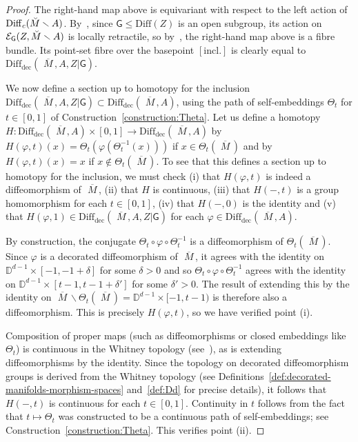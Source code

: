 \documentclass[AHL,Unicode,published]{cedram}
\newcommand{\Diff}{\mathrm{Diff}}
\newcommand{\rincl}{\mathrm{incl}}
\newcommand{\rdec}{\mathrm{dec}}
\newcommand{\mbar}{\ensuremath{{\,\,\overline{\!\! M\!}\,}}}
\newcommand{\sG}{\mathsf{G}}
\newcommand{\cE}{\mathcal{E}}
\newcommand{\bD}{\mathbb{D}}
\newcommand{\diffdec}{\ensuremath{\mathrm{Diff}_{\rdec}}}
\renewcommand{\leq}{\leqslant}
\begin{document}
\begin{proof}
The right-hand map above is equivariant with respect to the left action of $\Diff_c(\Breve{M} \smallsetminus A)$. By~\cite[Prop.~4.15]{Palmer2018HomologicalstabilitymoduliI}, since $\sG \leq \Diff(Z)$ is an open subgroup, its action on $\cE_{\sG}(Z,\Breve{M} \smallsetminus A)$ is locally retractile, so by~\cite[Th.~A]{Palais1960Localtrivialityof}, the right-hand map above is a fibre bundle. Its point-set fibre over the basepoint $[\rincl.]$ is clearly equal to $\diffdec(\mbar,A,Z|\sG)$.

We now define a section up to homotopy for the inclusion $\diffdec(\mbar,A,Z|\sG) \subset \diffdec(\mbar,A)$, using the path of self-embeddings $\Theta_t$ for $t \in [0,1]$ of Construction~\ref{construction:Theta}. Let us define a homotopy $H \colon \diffdec(\mbar,A) \times [0,1] \to \diffdec(\mbar,A)$ by $H(\varphi,t)(x) = \Theta_t(\varphi(\Theta_t^{-1}(x)))$ if $x \in \Theta_t(\mbar)$ and by $H(\varphi,t)(x) = x$ if $x \notin \Theta_t(\mbar)$. To see that this defines a section up to homotopy for the inclusion, we must check (i) that $H(\varphi,t)$ is indeed a diffeomorphism of $\mbar$, (ii) that $H$ is continuous, (iii) that $H(-,t)$ is a group homomorphism for each $t \in [0,1]$, (iv) that $H(-,0)$ is the identity and (v) that $H(\varphi,1) \in \diffdec(\mbar,A,Z|\sG)$ for each $\varphi \in \diffdec(\mbar,A)$.

By construction, the conjugate $\Theta_t \circ \varphi \circ \Theta_t^{-1}$ is a diffeomorphism of $\Theta_t(\mbar)$. Since $\varphi$ is a decorated diffeomorphism of $\mbar$, it agrees with the identity on $\bD^{d-1} \times [-1,-1+\delta]$ for some $\delta > 0$ and so $\Theta_t \circ \varphi \circ \Theta_t^{-1}$ agrees with the identity on $\bD^{d-1} \times [t-1,t-1+\delta']$ for some $\delta' > 0$. The result of extending this by the identity on $\mbar \smallsetminus \Theta_t(\mbar) = \bD^{d-1} \times [-1,t-1)$ is therefore also a diffeomorphism. This is precisely $H(\varphi,t)$, so we have verified point (i).

Composition of proper maps (such as diffeomorphisms or closed embeddings like $\Theta_t$) is continuous in the Whitney topology (see~\cite[\S~2, Prop.~1]{Mather1969}), as is extending diffeomorphisms by the identity. Since the topology on decorated diffeomorphism groups is derived from the Whitney topology (see Definitions~\ref{def:decorated-manifolds-morphism-spaces} and~\ref{def:Dd} for precise details), it follows that $H(-,t)$ is continuous for each $t \in [0,1]$. Continuity in $t$ follows from the fact that $t \mapsto \Theta_t$ was constructed to be a continuous path of self-embeddings; see Construction~\ref{construction:Theta}. This verifies point (ii).


\end{proof}
\end{document}
